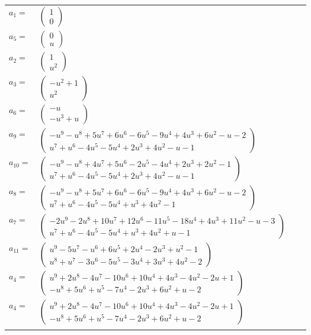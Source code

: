 \documentclass[1p]{elsarticle_modified}
\theoremstyle{definition}
\begin{document}
\begin{tabular}{m{7pt} m{180pt} m{7pt} m{180pt} }
\flushright $a_{1}=$&$\begin{pmatrix}1\\0\end{pmatrix}$ \\
\flushright $a_{5}=$&$\begin{pmatrix}0\\u\end{pmatrix}$ \\
\flushright $a_{2}=$&$\begin{pmatrix}1\\u^2\end{pmatrix}$ \\
\flushright $a_{3}=$&$\begin{pmatrix}- u^2+1\\u^2\end{pmatrix}$ \\
\flushright $a_{6}=$&$\begin{pmatrix}- u\\- u^3+u\end{pmatrix}$ \\
\flushright $a_{9}=$&$\begin{pmatrix}- u^9- u^8+5 u^7+6 u^6-6 u^5-9 u^4+4 u^3+6 u^2- u-2\\u^7+u^6-4 u^5-5 u^4+2 u^3+4 u^2- u-1\end{pmatrix}$ \\
\flushright $a_{10}=$&$\begin{pmatrix}- u^9- u^8+4 u^7+5 u^6-2 u^5-4 u^4+2 u^3+2 u^2-1\\u^7+u^6-4 u^5-5 u^4+2 u^3+4 u^2- u-1\end{pmatrix}$ \\
\flushright $a_{8}=$&$\begin{pmatrix}- u^9- u^8+5 u^7+6 u^6-6 u^5-9 u^4+4 u^3+6 u^2- u-2\\u^7+u^6-4 u^5-5 u^4+u^3+4 u^2-1\end{pmatrix}$ \\
\flushright $a_{7}=$&$\begin{pmatrix}-2 u^9-2 u^8+10 u^7+12 u^6-11 u^5-18 u^4+4 u^3+11 u^2- u-3\\u^7+u^6-4 u^5-5 u^4+u^3+4 u^2+u-1\end{pmatrix}$ \\
\flushright $a_{11}=$&$\begin{pmatrix}u^9-5 u^7- u^6+6 u^5+2 u^4-2 u^3+u^2-1\\u^8+u^7-3 u^6-5 u^5-3 u^4+3 u^3+4 u^2-2\end{pmatrix}$ \\
\flushright $a_{4}=$&$\begin{pmatrix}u^9+2 u^8-4 u^7-10 u^6+10 u^4+4 u^3-4 u^2-2 u+1\\- u^8+5 u^6+u^5-7 u^4-2 u^3+6 u^2+u-2\end{pmatrix}$\\ \flushright $a_{4}=$&$\begin{pmatrix}u^9+2 u^8-4 u^7-10 u^6+10 u^4+4 u^3-4 u^2-2 u+1\\- u^8+5 u^6+u^5-7 u^4-2 u^3+6 u^2+u-2\end{pmatrix}$\\&\end{tabular}
\end{document}
